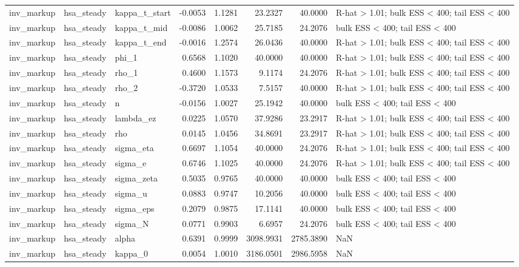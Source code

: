 \begin{tabular}{lllrrrrl}
inv\_markup & hsa\_steady & kappa\_t\_start & -0.0053 & 1.1281 & 23.2327 & 40.0000 & R-hat > 1.01; bulk ESS < 400; tail ESS < 400 \\
inv\_markup & hsa\_steady & kappa\_t\_mid & -0.0086 & 1.0062 & 25.7185 & 24.2076 & bulk ESS < 400; tail ESS < 400 \\
inv\_markup & hsa\_steady & kappa\_t\_end & -0.0016 & 1.2574 & 26.0436 & 40.0000 & R-hat > 1.01; bulk ESS < 400; tail ESS < 400 \\
inv\_markup & hsa\_steady & phi\_1 & 0.6568 & 1.1020 & 40.0000 & 40.0000 & R-hat > 1.01; bulk ESS < 400; tail ESS < 400 \\
inv\_markup & hsa\_steady & rho\_1 & 0.4600 & 1.1573 & 9.1174 & 24.2076 & R-hat > 1.01; bulk ESS < 400; tail ESS < 400 \\
inv\_markup & hsa\_steady & rho\_2 & -0.3720 & 1.0533 & 7.5157 & 40.0000 & R-hat > 1.01; bulk ESS < 400; tail ESS < 400 \\
inv\_markup & hsa\_steady & n & -0.0156 & 1.0027 & 25.1942 & 40.0000 & bulk ESS < 400; tail ESS < 400 \\
inv\_markup & hsa\_steady & lambda\_ez & 0.0225 & 1.0570 & 37.9286 & 23.2917 & R-hat > 1.01; bulk ESS < 400; tail ESS < 400 \\
inv\_markup & hsa\_steady & rho & 0.0145 & 1.0456 & 34.8691 & 23.2917 & R-hat > 1.01; bulk ESS < 400; tail ESS < 400 \\
inv\_markup & hsa\_steady & sigma\_eta & 0.6697 & 1.1054 & 40.0000 & 24.2076 & R-hat > 1.01; bulk ESS < 400; tail ESS < 400 \\
inv\_markup & hsa\_steady & sigma\_e & 0.6746 & 1.1025 & 40.0000 & 24.2076 & R-hat > 1.01; bulk ESS < 400; tail ESS < 400 \\
inv\_markup & hsa\_steady & sigma\_zeta & 0.5035 & 0.9765 & 40.0000 & 40.0000 & bulk ESS < 400; tail ESS < 400 \\
inv\_markup & hsa\_steady & sigma\_u & 0.0883 & 0.9747 & 10.2056 & 40.0000 & bulk ESS < 400; tail ESS < 400 \\
inv\_markup & hsa\_steady & sigma\_eps & 0.2079 & 0.9875 & 17.1141 & 40.0000 & bulk ESS < 400; tail ESS < 400 \\
inv\_markup & hsa\_steady & sigma\_N & 0.0771 & 0.9903 & 6.6957 & 24.2076 & bulk ESS < 400; tail ESS < 400 \\
inv\_markup & hsa\_steady & alpha & 0.6391 & 0.9999 & 3098.9931 & 2785.3890 & NaN \\
inv\_markup & hsa\_steady & kappa\_0 & 0.0054 & 1.0010 & 3186.0501 & 2986.5958 & NaN \\

\end{tabular}
